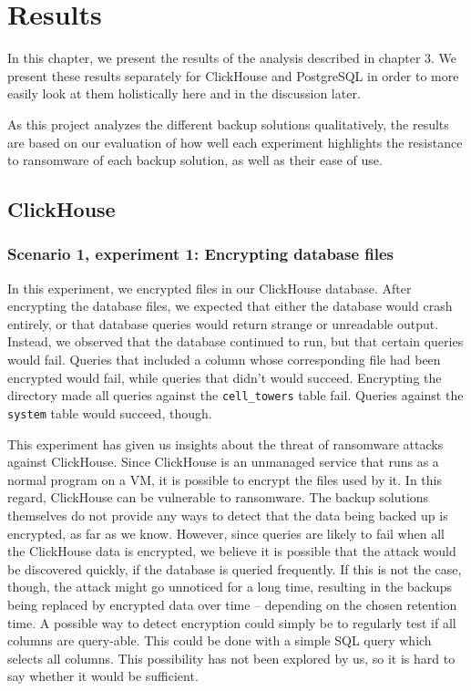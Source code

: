 \chapter{Results}
\label{Results}
In this chapter, we present the results of the analysis described in chapter 3. We present these results separately for ClickHouse and PostgreSQL in order to more easily look at them holistically here and in the discussion later. 

As this project analyzes the different backup solutions qualitatively, the results are based on our evaluation of how well each experiment highlights the resistance to ransomware of each backup solution, as well as their ease of use.   

\section{ClickHouse}

\subsection{Scenario 1, experiment 1: Encrypting database files}

In this experiment, we encrypted files in our ClickHouse database.
After encrypting the database files, we expected that either the database would crash entirely, or that database queries would return strange or unreadable output.
Instead, we observed that the database continued to run, but that certain queries would fail. Queries that included a column whose corresponding file had been encrypted would fail, while queries that didn't would succeed.
Encrypting the  directory made all queries against the \texttt{cell\_towers} table fail. Queries against the \texttt{system} table would succeed, though.

This experiment has given us insights about the threat of ransomware attacks against ClickHouse.
Since ClickHouse is an unmanaged service that runs as a normal program on a VM, it is possible to encrypt the files used by it. In this regard, ClickHouse can be vulnerable to ransomware. The backup solutions themselves do not provide any ways to detect that the data being backed up is encrypted, as far as we know.
However, since queries are likely to fail when all the ClickHouse data is encrypted, we believe it is possible that the attack would be discovered quickly, if the database is queried frequently.
If this is not the case, though, the attack might go unnoticed for a long time, resulting in the backups being replaced by encrypted data over time -- depending on the chosen retention time. 
A possible way to detect encryption could simply be to regularly test if all columns are query-able. This could be done with a simple SQL query which selects all columns. This possibility has not been explored by us, so it is hard to say whether it would be sufficient.

